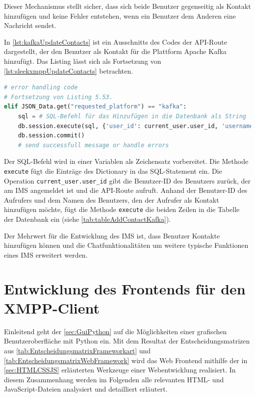 \documentclass[a4paper,titlepage,halfparskip,12pt]{scrreprt}
\begin{document}
\begin{onehalfspacing}
Dieser Mechanismus stellt sicher, dass sich beide Benutzer gegenseitig als Kontakt hinzufügen und keine Fehler entstehen, wenn ein Benutzer dem Anderen eine Nachricht sendet.

In \autoref{lst:kafkaUpdateContacts} ist ein Ausschnitts des Codes der \acs{API}-Route dargestellt, der den Benutzer als Kontakt für die Plattform Apache Kafka hinzufügt. Das Listing lässt sich als Fortsetzung von \autoref{lst:sleekxmppUpdateContacts} betrachten.

\begin{lstlisting}[language=python, caption={Code für das Hinzufügen eines Kontakts der Plattform Kafka}, label={lst:kafkaUpdateContacts}]
# error handling code
# Fortsetzung von Listing 5.53.
elif JSON_Data.get("requested_platform") == "kafka":
    sql = # SQL-Befehl für das Hinzufügen in die Datenbank als String
    db.session.execute(sql, {'user_id': current_user.user_id, 'username': user_name})
    db.session.commit()
    # send successfull message or handle errors
\end{lstlisting}

Der SQL-Befehl wird in einer Variablen als Zeichensatz vorbereitet. Die Methode \texttt{execute} fügt die Einträge des Dictionary in das SQL-Statement ein. Die Operation \texttt{current\_user.user\_id} gibt die Benutzer-ID des Benutzers zurück, der am \acs{IMS} angemeldet ist und die \acs{API}-Route aufruft. Anhand der Benutzer-ID des Aufrufers und dem Namen des Benutzers, den der Aufrufer als Kontakt hinzufügen möchte, fügt die Methode \texttt{execute} die beiden Zeilen in die Tabelle der Datenbank ein (siehe \autoref{tab:tableAddContactKafka}).

Der Mehrwert für die Entwicklung des \acs{IMS} ist, dass Benutzer Kontakte hinzufügen können und die Chatfunktionalitäten um weitere typische Funktionen eines \acs{IMS} erweitert werden.

\pagebreak

\chapter{Entwicklung des Frontends für den XMPP-Client}
\label{sec:FrontendXMPP}
Einleitend geht der \autoref{sec:GuiPython} auf die Möglichkeiten einer grafischen Benutzeroberfläche mit Python ein. Mit dem Resultat der Entscheidungsmatrizen aus \autoref{tab:EntscheidungsmatrixFrameworkart} und \autoref{tab:EntscheidungsmatrixWebFramework} wird das Web Frontend mithilfe der in \autoref{sec:HTMLCSSJS} erläuterten Werkzeuge einer Webentwicklung realisiert. In diesem Zusammenhang werden im Folgenden alle relevanten HTML- und JavaScript-Dateien analysiert und detailliert erläutert. 


\end{onehalfspacing}
\end{document}
